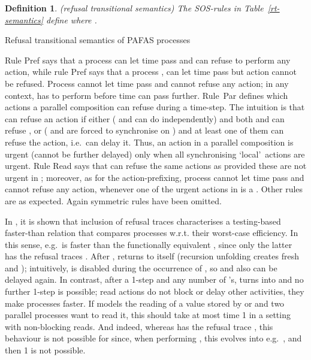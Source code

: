 \documentclass[copyright,creativecommons]{eptcs}
\newtheorem{definition}[theorem]{Definition}
\def\name#1{\mbox{\sc #1}}
\begin{document}
\begin{definition}\label{PAFASRT}\rm ({\em refusal transitional semantics})
The SOS-rules in Table~\ref{rt-semantics} define  where .
\end{definition}
\begin{table}[tbh]
\small

\caption{Refusal transitional semantics of PAFAS processes}
\label{rt-semantics}
\end{table}
Rule \name{Pref} says that a process  can let time pass
and can refuse to perform any action, while rule \name{Pref} says
that a process , can let time pass but action
 cannot be refused. Process  cannot let time
pass and cannot refuse any action; in any context,  has
to perform  before time can pass further. Rule~\name{Par}
defines which actions a parallel composition can refuse during a time-step.
The intuition is that  can refuse an action  if
either  ( and  can do  independently)
and both  and  can refuse , or  ( and
 are forced to synchronise on ) and at least one of them can
refuse the action, i.e.\ can delay it. Thus, an action in a parallel
composition is urgent (cannot be further delayed) only when all
synchronising \lq local\rq\ actions are urgent. Rule \name{Read}
says that  can refuse the same actions as
 provided these are not urgent in ;
moreover, as for the action-prefixing,  process  cannot let time pass and cannot refuse any action,  whenever one
of the urgent actions in  is a . Other
rules are as expected. Again symmetric rules have been omitted.

In \cite{CVJ02}, it is shown that inclusion of refusal traces characterises
a testing-based faster-than relation that compares processes w.r.t. their
worst-case efficiency. In this sense, e.g.\  is
faster than the functionally equivalent , since
only the latter has the refusal traces .  After , 
returns to itself (recursion unfolding creates fresh  and );
intuitively,  is disabled during the occurrence of , so  and also
 can be delayed again. In contrast, after a 1-step and any number of
's,  turns into  and no
further 1-step is possible; read actions do not block or delay other
activities, they make processes faster. If  models the reading of a
value stored by  or  and two parallel processes want to read it,
this should take at most time 1 in a setting with non-blocking reads. And
indeed, whereas  has
the refusal trace , this behaviour is not possible for  since, when performing
, this evolves into e.g.\ , and
then 1 is not possible.
\end{document}

